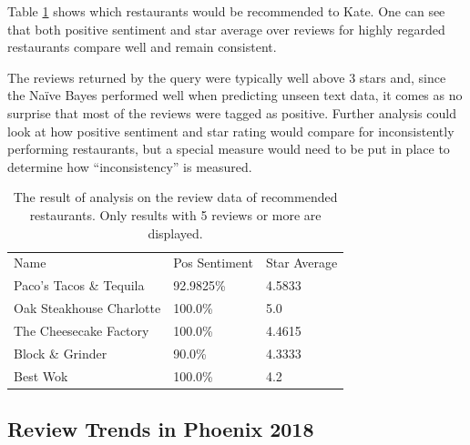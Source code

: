 
Table \ref{tab:kateResult} shows which restaurants would be recommended to Kate. One can see that both positive sentiment and star average over reviews for highly regarded restaurants compare well and remain consistent.

The reviews returned by the query were typically well above 3 stars and, since the Na\"ive Bayes performed well when predicting unseen text data, it comes as no surprise that most of the reviews were tagged as positive. Further analysis could look at how positive sentiment and star rating would compare for inconsistently performing restaurants, but a special measure would need to be put in place to determine how ``inconsistency'' is measured.

\begin{table}
    \small
    \centering
    \caption{The result of analysis on the review data of recommended restaurants. Only results with 5 reviews or more are displayed.}
    \begin{tabular}{ |p{3.25cm}||p{1.78cm}|p{1.59cm}|}
        \hline
        \rowcolor{Gray}
        \multicolumn{3}{|c|}{Businesses in Phoenix 2018} \\
        \hline
        \rowcolor{LightGray}
        Name & Pos Sentiment & Star Average                 \\
        \hline
        Paco's Tacos \& Tequila     & 92.9825\%  & 4.5833 \\
        Oak Steakhouse Charlotte    & 100.0\%    & 5.0 \\
        The Cheesecake Factory      & 100.0\%    & 4.4615 \\
        Block \& Grinder            & 90.0\%     & 4.3333 \\
        Best Wok                    & 100.0\%    & 4.2 \\
        \hline
    \end{tabular}
    \label{tab:kateResult}
\end{table}

\subsection{Review Trends in Phoenix 2018}
\label{sec:resultReviews2018}

